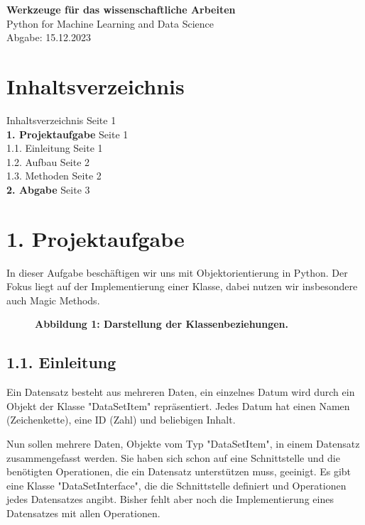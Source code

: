 \documentclass[a4paper,12pt]{article}
\begin{document}
\begin{flushleft}
{\bfseries\Large Werkzeuge für das wissenschaftliche Arbeiten}\\
\normalsize Python for Machine Learning and Data Science\\
\normalfont\hspace*{4.5cm}Abgabe: 15.12.2023\\
\hrulefill
\end{flushleft}

\section*{Inhaltsverzeichnis}
Inhaltsverzeichnis \dotfill Seite 1\\
\textbf{1. Projektaufgabe} \dotfill Seite 1\\
1.1. Einleitung \dotfill Seite 1\\
1.2. Aufbau \dotfill Seite 2\\
1.3. Methoden \dotfill Seite 2\\
\textbf{2. Abgabe} \dotfill Seite 3\\
\hrulefill

\section{1. Projektaufgabe}
\justify
In dieser Aufgabe beschäftigen wir uns mit Objektorientierung in Python. Der Fokus liegt auf der Implementierung einer Klasse, dabei nutzen wir insbesondere auch Magic Methods.

\begin{figure}[h!]
    \centering
    
    \caption*{\scriptsize\bfseries Abbildung 1: \normalfont Darstellung der Klassenbeziehungen.}
\end{figure}

\subsection{1.1. Einleitung}
\justify
Ein Datensatz besteht aus mehreren Daten, ein einzelnes Datum wird durch ein Objekt der Klasse "DataSetItem" repräsentiert. Jedes Datum hat einen Namen (Zeichenkette), eine ID (Zahl) und beliebigen Inhalt.

Nun sollen mehrere Daten, Objekte vom Typ "DataSetItem", in einem Datensatz zusammengefasst werden. Sie haben sich schon auf eine Schnittstelle und die benötigten Operationen, die ein Datensatz unterstützen muss, geeinigt. Es gibt eine Klasse "DataSetInterface", die die Schnittstelle definiert und Operationen jedes Datensatzes angibt. Bisher fehlt aber noch die Implementierung eines Datensatzes mit allen Operationen.
\end{document}
